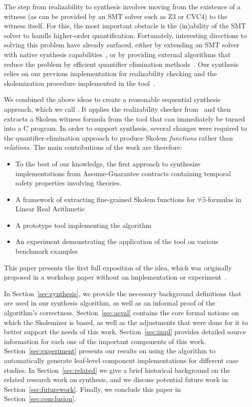 The step from realizability to synthesis involves moving from the existence of a witness (as can be provided by an SMT solver such as Z3 or CVC4) to the witness itself.  For this, the most important obstacle is the (in)ability of the SMT solver to handle higher-order quantification. Fortunately, interesting directions to solving this problem have already surfaced, either by extending an SMT solver with native synthesis capabilities~\cite{reynoldscounterexample}, or by providing external algorithms that reduce the problem by efficient quantifier elimination methods~\cite{fedyukovichae}.  Our synthesis relies on our previous implementation for realizability checking and the skolemization procedure implemented in the \aeval tool~\cite{fedyukovichae}.


We combined the above ideas to create a reasonable sequential synthesis
approach, which we call \jkindsynt.  It applies the realizability checker
from~\cite{Katis15:Realizability} and then extracts a Skolem witness formula from the \aeval tool that can immediately be turned into a C program.  In order to support synthesis, several changes were required to the quantifier-elimination approach to produce Skolem {\em functions} rather than {\em relations}.  The main contributions of the work are therefore:
\begin{itemize}
	\item To the best of our knowledge, the first approach to synthesize implementations from Assume-Guarantee contracts containing temporal safety properties involving theories.
	\item A framework of extracting fine-grained Skolem functions for $\forall\exists$-formulas in Linear Real Arithmetic
	\item A prototype tool implementing the algorithm
	\item An experiment demonstrating the application of the tool on various benchmark examples
\end{itemize}

\noindent This paper presents the first full exposition of the idea, which was originally proposed in a workshop paper without an implementation or experiment~\cite{katis2016towards}.

In Section~\ref{sec:synthesis}, we provide the necessary background
definitions that are used in our synthesis algorithm, as well as an informal
proof of the algorithm's correctness. Section~\ref{sec:aeval} contains the
core formal notions on which the \aeval Skolemizer is based, as well
as the adjustments that were done for it to better support the needs of this
work. Section~\ref{sec:impl} provides detailed
source information for each one of the important
components of this work. Section~\ref{sec:experiment} presents our results on
using the algorithm to automatically generate leaf-level component implementations for different case studies.
In Section~\ref{sec:related} we give a brief historical background on the
related research work on synthesis, and we discuss potential future work in
Section~\ref{sec:futurework}. Finally, we conclude this paper in
Section~\ref{sec:conclusion}.

